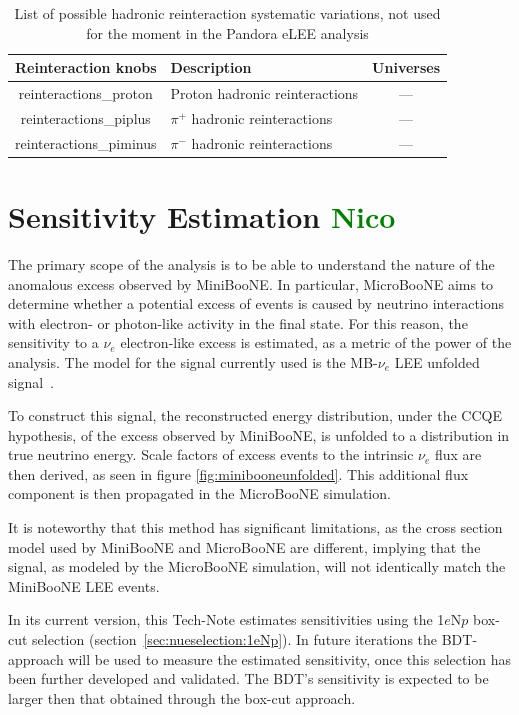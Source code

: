 \documentclass[a4paper]{article}
\newcommand{\nue}{$\nu_e$ }
\begin{document}
\begin{table}[H]
\centering
 \begin{tabular}{| c | m{6cm} | c |} 
    \hline
\hline
Reinteraction knobs & Description & Universes \\
\hline
reinteractions\_proton        &  Proton hadronic reinteractions  & ---\\ 
reinteractions\_piplus   &  $\pi^+$ hadronic reinteractions & ---\\ 
reinteractions\_piminus        & $\pi^-$ hadronic reinteractions  & ---\\ 
\hline
\end{tabular}
\caption{List of possible hadronic reinteraction systematic variations, not used for the moment in the Pandora eLEE analysis}
\label{tab:fluxsyst}
\end{table}

\newpage

\section{Sensitivity Estimation \textcolor{green}{Nico}}

\label{sec:Sensitivity2Osc}
\label{sec:sensitivity}

The primary scope of the analysis is to be able to understand the nature of the anomalous excess observed by MiniBooNE. In particular, MicroBooNE aims to determine whether a potential excess of events is caused by neutrino interactions with electron- or photon-like activity in the final state.
For this reason, the sensitivity to a \nue electron-like excess is estimated, as a metric of the power of the analysis.
The model for the signal currently used is the MB-$\nu_e$ LEE unfolded signal~\cite{C2}.

To construct this signal, the reconstructed energy distribution, under the CCQE hypothesis, of the excess observed by MiniBooNE, is unfolded to a distribution in true neutrino energy.
Scale factors of excess events to the intrinsic \nue flux are then derived, as seen in figure \ref{fig:minibooneunfolded}.
This additional flux component is then propagated in the MicroBooNE simulation.

It is noteworthy that this method has significant limitations, as the cross section model used by MiniBooNE and MicroBooNE are different, implying that the signal, as modeled by the MicroBooNE simulation, will not identically match the MiniBooNE LEE events.

In its current version, this Tech-Note estimates sensitivities using the 1$e$N$p$ box-cut selection (section~\ref{sec:nueselection:1eNp}). In future iterations the BDT-approach will be used to measure the estimated sensitivity, once this selection has been further developed and validated. The BDT's sensitivity is expected to be larger then that obtained through the box-cut approach.
\end{document}
